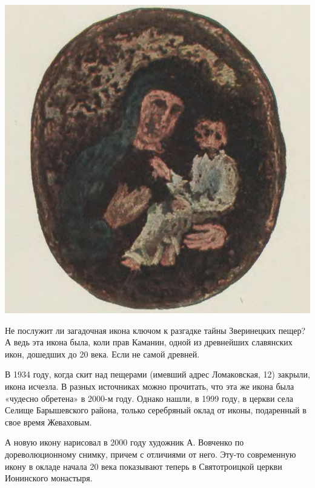 \begin{center}
\includegraphics[width=\linewidth]{chast-colebanie-osnov/nachalo/zver-ikon.jpg}
\end{center}

Не послужит ли загадочная икона ключом к разгадке тайны Зверинецких пещер? А ведь эта икона была, коли прав Каманин, одной из древнейших славянских икон, дошедших до 20 века. Если не самой древней. 



В 1934 году, когда скит над пещерами (имевший адрес Ломаковская, 12) закрыли, икона исчезла. В разных источниках можно прочитать, что эта же икона была «чудесно обретена» в 2000-м году. Однако нашли, в 1999 году, в церкви села Селище Барышевского района, только серебряный оклад от иконы, подаренный в свое время Жеваховым.

А новую икону нарисовал в 2000 году художник А. Вовченко по дореволюционному снимку, причем с отличиями от него. Эту-то современную икону в окладе начала 20 века показывают теперь в Святотроицкой церкви Ионинского монастыря.
  
